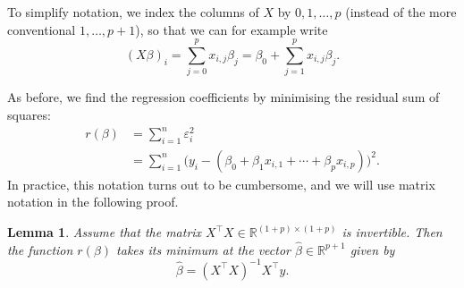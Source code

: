 \documentclass[
  a4paper,
]{article}
\newtheorem{lemma}{Lemma}[section]
\theoremstyle{definition}
\theoremstyle{definition}
\theoremstyle{definition}
\theoremstyle{definition}
\theoremstyle{remark}
\begin{document}
To simplify notation, we index the columns of \(X\) by \(0, 1, \ldots, p\) (instead of the more conventional \(1, \ldots, p+1\)), so that we
can for example write
\begin{equation*}
  (X \beta)_i
  = \sum_{j=0}^p x_{i,j} \beta_j
  = \beta_0 + \sum_{j=1}^p x_{i,j} \beta_j.
\end{equation*}

As before, we find the regression coefficients by minimising
the residual sum of squares:
\begin{align*}
  r(\beta)
  &= \sum_{i=1}^n \varepsilon_i^2 \\
  &= \sum_{i=1}^n \bigl( y_i - (\beta_0 + \beta_1 x_{i,1} + \cdots + \beta_p x_{i,p}) \bigr)^2.
\end{align*}
In practice, this notation turns out to be cumbersome, and we will
use matrix notation in the following proof.

\begin{lemma}
\protect\hypertarget{lem:multiple-LSQ}{}\label{lem:multiple-LSQ}Assume that the matrix \(X^\top X \in \mathbb{R}^{(1+p) \times (1+p)}\) is
invertible. Then the function \(r(\beta)\) takes its minimum at the
vector \(\hat\beta\in\mathbb{R}^{p+1}\) given by
\begin{equation*}
  \hat\beta
  = (X^\top X)^{-1} X^\top y.
\end{equation*}
\end{lemma}
\end{document}
